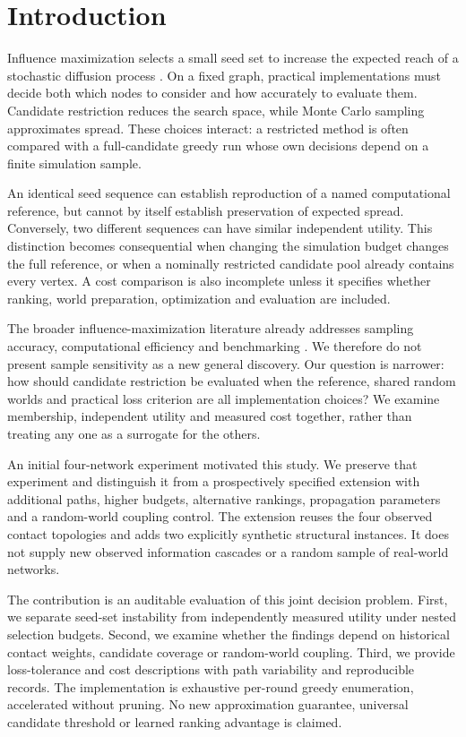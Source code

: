 \section{Introduction}
Influence maximization selects a small seed set to increase the expected reach of a stochastic diffusion process \cite{ref1}. On a fixed graph, practical implementations must decide both which nodes to consider and how accurately to evaluate them. Candidate restriction reduces the search space, while Monte Carlo sampling approximates spread. These choices interact: a restricted method is often compared with a full-candidate greedy run whose own decisions depend on a finite simulation sample.

An identical seed sequence can establish reproduction of a named computational reference, but cannot by itself establish preservation of expected spread. Conversely, two different sequences can have similar independent utility. This distinction becomes consequential when changing the simulation budget changes the full reference, or when a nominally restricted candidate pool already contains every vertex. A cost comparison is also incomplete unless it specifies whether ranking, world preparation, optimization and evaluation are included.

The broader influence-maximization literature already addresses sampling accuracy, computational efficiency and benchmarking \cite{ref2,ref8,ref9,ref10,ref16}. We therefore do not present sample sensitivity as a new general discovery. Our question is narrower: how should candidate restriction be evaluated when the reference, shared random worlds and practical loss criterion are all implementation choices? We examine membership, independent utility and measured cost together, rather than treating any one as a surrogate for the others.

An initial four-network experiment motivated this study. We preserve that experiment and distinguish it from a prospectively specified extension with additional paths, higher budgets, alternative rankings, propagation parameters and a random-world coupling control. The extension reuses the four observed contact topologies and adds two explicitly synthetic structural instances. It does not supply new observed information cascades or a random sample of real-world networks.

The contribution is an auditable evaluation of this joint decision problem. First, we separate seed-set instability from independently measured utility under nested selection budgets. Second, we examine whether the findings depend on historical contact weights, candidate coverage or random-world coupling. Third, we provide loss-tolerance and cost descriptions with path variability and reproducible records. The implementation is exhaustive per-round greedy enumeration, accelerated without pruning. No new approximation guarantee, universal candidate threshold or learned ranking advantage is claimed.

